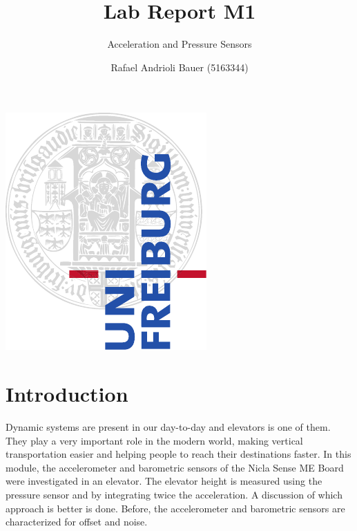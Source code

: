 \documentclass[DIV=14]{scrartcl}
\title{Lab Report M1}
\subtitle{Acceleration and Pressure Sensors}
\author{Rafael Andrioli Bauer (5163344)}
\begin{document}
    \maketitle

    \thispagestyle{empty}

    \vfill
    \begin{center}
        \includegraphics{ufcd-logo-e1-a4-color.pdf} \vspace{1cm} \\
    \end{center}
    \vfill


    \clearpage


    \section{Introduction}
    Dynamic systems are present in our day-to-day and elevators is one of them.
    They play a very important role in the modern world, making vertical transportation easier and helping people
    to reach their destinations faster.
    In this module, the accelerometer and barometric sensors of the Nicla Sense ME Board were investigated in an elevator.
    The elevator height is measured using the pressure sensor and by integrating twice the acceleration.
    A discussion of which approach is better is done.
    Before, the accelerometer and barometric sensors are characterized for offset and noise.
\end{document}
